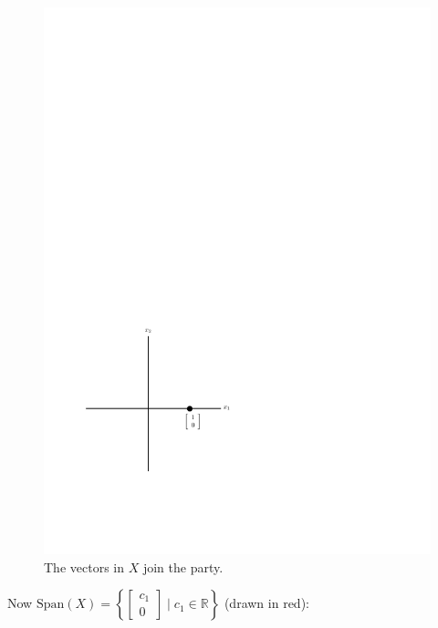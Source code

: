 \documentclass[12pt]{article}
\begin{document}
\begin{figure}[h!]
\begin{center} 
\includegraphics[scale=0.5]{l19comim2}
\caption{The vectors in $X$ join the party.}
\end{center}
\end{figure} 

Now $\text{Span}(X)= \left \{\left[ \begin{array}{c} c_1   \\ 0  \end{array} \right] \mid c_1 \in \mathbb{R} \right\}$ (drawn in red):
\end{document}
